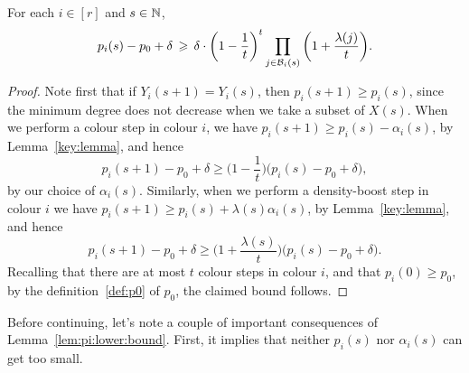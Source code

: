 
\begin{lemma}
  \label{lem:pi:lower:bound} %
  For each $i \in [r]$ and $s \in \mathbb{N}$, 
  \begin{equation}\label{eq:pi:lower:bound}
    p_i(s) - p_0 + \delta \, \geqslant \, \delta \cdot \bigg( 1 - \frac{1}{t} \bigg)^{t} \prod_{j \in \mathcal{B}_i(s)} \bigg( 1 + \frac{\lambda(j)}{t} \bigg).
  \end{equation}
\end{lemma}

\begin{proof}
  Note first that if $Y_i(s+1) = Y_i(s)$, then $p_i(s+1) \ge p_i(s)$, since the minimum degree does not decrease when we take a subset of $X(s)$. When we perform a colour step in colour $i$, %
  we have $p_i(s+1) \ge p_i(s) - \alpha_i(s)$, by Lemma~\ref{key:lemma}, and hence
  $$p_i(s+1) - p_0 + \delta \ge \bigg( 1 - \frac{1}{t} \bigg) \big( p_i(s) - p_0 + \delta \big),$$
  by our choice of $\alpha_i(s)$. Similarly, when we perform a density-boost step in colour $i$  
  we have $p_i(s+1) \ge p_i(s) + \lambda(s) \alpha_i(s)$, by Lemma~\ref{key:lemma}, and hence
  $$p_i(s+1) - p_0 + \delta \ge \bigg( 1 + \frac{\lambda(s)}{t} \bigg) \big( p_i(s) - p_0 + \delta \big).$$
  Recalling that there are at most $t$ colour steps in colour $i$, and that $p_i(0) \ge p_0$, by the definition~\eqref{def:p0} of $p_0$, the claimed bound follows. 
\end{proof}

Before continuing, let's note a couple of important consequences of Lemma~\ref{lem:pi:lower:bound}. First, it implies that neither $p_i(s)$ nor $\alpha_i(s)$ can get too small. 


